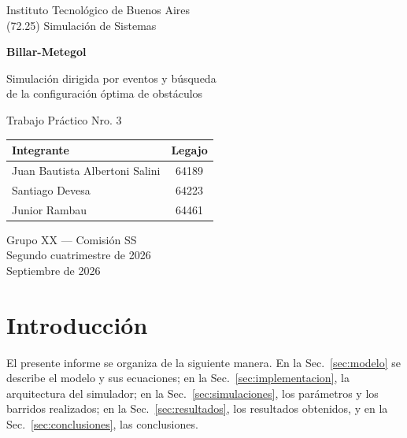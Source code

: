 \documentclass[11pt,a4paper]{article}
\begin{document}
\shorthandoff{<>}

\begin{titlepage}
  \centering
  \vspace*{1cm}

  {\large Instituto Tecnológico de Buenos Aires}\\[0.5em]
  {\large (72.25) Simulación de Sistemas}\\[3cm]

  {\Huge\bfseries Billar-Metegol\par}
  \vspace{1em}
  {\LARGE Simulación dirigida por eventos y búsqueda\\ de la configuración óptima de obstáculos\par}
  \vspace{1.5em}
  {\Large Trabajo Práctico Nro. 3\par}

  \vspace{3cm}

  \begin{tabular}{@{}lc@{}}
    \toprule
    Integrante & Legajo \\
    \midrule
    Juan Bautista Albertoni Salini & 64189 \\
    Santiago Devesa & 64223 \\
    Junior Rambau & 64461 \\
    \bottomrule
  \end{tabular}

  \vfill

  Grupo XX --- Comisión SS\\
  Segundo cuatrimestre de 2026\\
  Septiembre de 2026
\end{titlepage}

\tableofcontents
\newpage

\FloatBarrier
\section{Introducción}
\label{sec:introduccion}


El presente informe se organiza de la siguiente manera. En la
Sec.~\ref{sec:modelo} se describe el modelo y sus ecuaciones; en la
Sec.~\ref{sec:implementacion}, la arquitectura del simulador; en la
Sec.~\ref{sec:simulaciones}, los parámetros y los barridos realizados; en la
Sec.~\ref{sec:resultados}, los resultados obtenidos, y en la
Sec.~\ref{sec:conclusiones}, las conclusiones.
\end{document}
